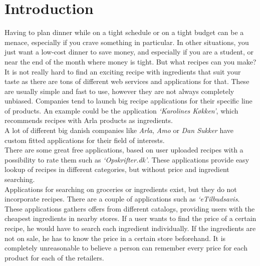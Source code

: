 \chapter{Introduction}
\label{chap:intro}

Having to plan dinner while on a tight schedule or on a tight budget can be a menace, especially if you crave something in particular. In other situations, you just want a low-cost dinner to save money, and especially if you are a student, or near the end of the month where money is tight. But what recipes can you make?\\
It is not really hard to find an exciting recipe with ingredients that suit your taste as there are tons of different web services and applications for that. These are usually simple and fast to use, however they are not always completely unbiased. Companies tend to launch big recipe applications for their specific line of products. An example could be the application \emph{`Karolines Køkken'}\cite{arla}, which recommends recipes with Arla products as ingredients.\\ A lot of different big danish companies like \textit{Arla}, \textit{Amo} or \textit{Dan Sukker} have custom fitted applications for their field of interests. \\
There are some great free applications, based on user uploaded recipes with a possibility to rate them such as \emph{`Opskrifter.dk'}\cite{opskrifterdk}. These applications provide easy lookup of recipes in different categories, but without price and ingredient searching. \\
Applications for searching on groceries or ingredients exist, but they do not incorporate recipes. There are a couple of applications such as \emph{`eTilbudsavis}\cite{etilbudsavis}. These applications gathers offers from different catalogs, providing users with the cheapest ingredients in nearby stores. If a user wants to find the price of a certain recipe, he would have to search each ingredient individually. If the ingredients are not on sale, he has to know the price in a certain store beforehand. It is completely unreasonable to believe a person can remember every price for each product for each of the retailers.






